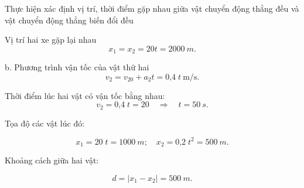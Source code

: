 \begin{dang}{Thực hiện xác định vị trí, thời điểm gặp nhau giữa vật chuyển động thẳng đều và vật chuyển động thẳng biến đổi đều}
{		Vị trí hai xe gặp lại nhau 
			$$x_1 =x_2 =20t=\SI{2000}{m}.$$
		
		b. Phương trình vận tốc của vật thứ hai
		$$v_2 =v_{20}+a_2t=\text{0,4}\;t\ \text{m/s}.$$
		
		Thời điểm lúc hai vật có vận tốc bằng nhau: 
		$$v_2 =\text{0,4}\;t = 20 \quad\Rightarrow\quad t = \SI{50}{s}.$$
		
		Tọa độ các vật lúc đó: 
		
		$$x_1 = 20\;t = \SI{1000}{m};\quad x_2 = \text{0,2}\;t^2 = \SI{500}{m}.$$
		
		Khoảng cách giữa hai vật: 
		
		$$d= \left|x_1 - x_2\right| =\SI{500}{m}.$$
	}
	
\end{dang}


